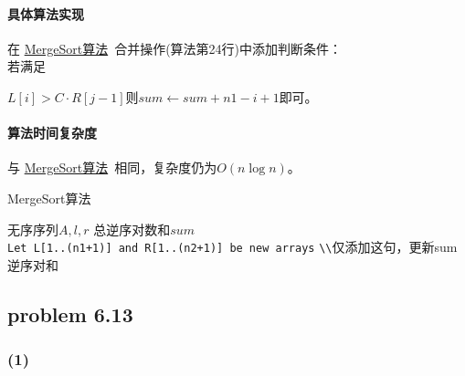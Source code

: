 \documentclass[11pt]{ctexart}
\begin{document}
		\paragraph{具体算法实现}
	在 \hyperref[MergeSort算法]{MergeSort算法}\ 合并操作(算法第24行)中添加判断条件：\\
	若满足{$L[i]>C\cdot R[j-1]$则$sum\gets sum+n1-i+1$即可。
	\paragraph{算法时间复杂度}与 \hyperref[MergeSort算法]{MergeSort算法}\ 相同，复杂度仍为$O(n\log n)$。
	\begin{algorithm}
		\caption{MergeSort算法}
		\label{MergeSort算法}
		\begin{algorithmic}[1]
			\Require 无序序列$A,l,r$
			\Ensure  总逆序对数和$sum$
			\EndFunction
			\\
			\verb|Let L[1..(n1+1)] and R[1..(n2+1)] be new arrays|
			\EndFor
			\EndFor
				\Else
				\verb|\\|仅添加这句，更新sum逆序对和
				\EndIf
			\EndFor
			\EndFunction
		\end{algorithmic}
	\end{algorithm}
	\newpage
	\subsection*{problem 6.13}
	\subsubsection*{(1)}
}
\end{document}
